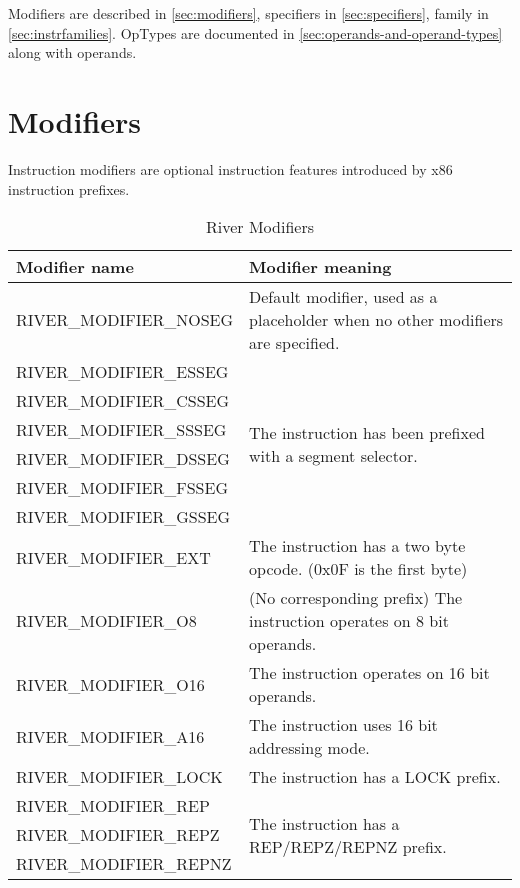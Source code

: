 \documentclass[12pt]{report}
\begin{document}
Modifiers are described in \autoref{sec:modifiers}, specifiers in \autoref{sec:specifiers}, family in \autoref{sec:instrfamilies}. OpTypes are documented in \autoref{sec:operands-and-operand-types} along with operands.

\section{Modifiers}
\label{sec:modifiers}
Instruction modifiers are optional instruction features introduced by x86 instruction prefixes.\\
\begin{table}[H]
	\begin{tabular}[t]{| p{6cm} | p{10cm} |}
		\hline
		\textbf{Modifier name} & \textbf{Modifier meaning}\\ \hline
		RIVER\_MODIFIER\_NOSEG & Default modifier, used as a placeholder when no other modifiers are specified.\\ \hline
		RIVER\_MODIFIER\_ESSEG & \multirow{6}{*}{The instruction has been prefixed with a segment selector.} \\
		RIVER\_MODIFIER\_CSSEG &\\
		RIVER\_MODIFIER\_SSSEG &\\
		RIVER\_MODIFIER\_DSSEG &\\
		RIVER\_MODIFIER\_FSSEG &\\
		RIVER\_MODIFIER\_GSSEG &\\ \hline
		RIVER\_MODIFIER\_EXT & The instruction has a two byte opcode. (0x0F is the first byte)\\ \hline
		RIVER\_MODIFIER\_O8 & (No corresponding prefix) The instruction operates on 8 bit operands.\\ \hline
		RIVER\_MODIFIER\_O16 & The instruction operates on 16 bit operands.\\ \hline
		RIVER\_MODIFIER\_A16 & The instruction uses 16 bit addressing mode.\\ \hline
		RIVER\_MODIFIER\_LOCK & The instruction has a LOCK prefix.\\ \hline
		RIVER\_MODIFIER\_REP & \multirow{3}{*}{The instruction has a REP/REPZ/REPNZ prefix.}\\
		RIVER\_MODIFIER\_REPZ &\\
		RIVER\_MODIFIER\_REPNZ &\\ \hline
	\end{tabular}
	\caption{River Modifiers}
	\label{table:river-modifiers}
\end{table}
\end{document}
